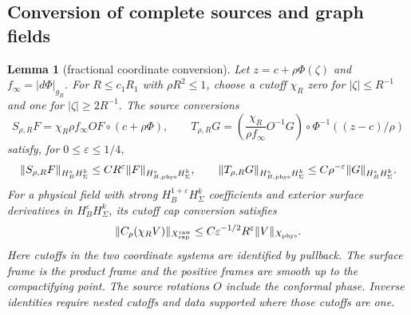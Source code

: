 \documentclass[11pt]{amsart}
\newtheorem{lemma}[theorem]{Lemma}
\theoremstyle{definition}
\theoremstyle{remark}
\theoremstyle{plain}
\begin{document}
\subsection{Conversion of complete sources and graph fields}

\begin{lemma}[fractional coordinate conversion]\label{lem:gluing-coordinate-conversion}
Let $z=c+\rho\Phi(\zeta)$ and $f_\infty=|d\Phi|_{g_B}$.
For $R\leq c_1R_1$ with $\rho R^2\leq1$, choose a cutoff
$\chi_R$ zero for $|\zeta|\leq R^{-1}$ and one for
$|\zeta|\geq2R^{-1}$. The source conversions
\[
 S_{\rho,R}F=\chi_R\rho f_\infty O F\circ(c+\rho\Phi),
 \qquad
 T_{\rho,R}G=\left(\frac{\chi_R}{\rho f_\infty}O^{-1}G\right)
                                      \circ\Phi^{-1}((z-c)/\rho)
\]
satisfy, for $0\leq\varepsilon\leq1/4$,
\begin{equation}\label{eq:gluing-source-conversion}
 \|S_{\rho,R}F\|_{H_B^\varepsilon H^k_\Sigma}
               \leq CR^\varepsilon\|F\|_{H_{B,\rm phys}^\varepsilon H^k_\Sigma},
 \qquad
 \|T_{\rho,R}G\|_{H_{B,\rm phys}^\varepsilon H^k_\Sigma}
               \leq C\rho^{-\varepsilon}\|G\|_{H_B^\varepsilon H^k_\Sigma}.
\end{equation}
For a physical field with strong $H_B^{1+\varepsilon}H^k_\Sigma$
coefficients and exterior surface derivatives in $H_B^\varepsilon H^k_\Sigma$,
its cutoff cap conversion satisfies
\begin{equation}\label{eq:gluing-field-conversion}
 \|C_\rho(\chi_RV)\|_{X^{\rm raw}_{\rm cap}}
              \leq C\varepsilon^{-1/2}R^\varepsilon\|V\|_{X_{\rm phys}}.
\end{equation}
Here cutoffs in the two coordinate systems are identified by pullback.
The surface frame is the product frame and the positive frames are
smooth up to the compactifying point. The source rotations $O$
include the conformal phase. Inverse identities require nested cutoffs
and data supported where those cutoffs are one.
\end{lemma}
\end{document}

